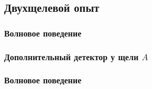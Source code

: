 \subsection{Двухщелевой опыт}
\begin{frame}
    \frametitle{Волновое поведение}
    \begin{figure}
    
    \end{figure}
\end{frame}
\begin{frame}
    \frametitle{Дополнительный детектор у щели $A$}
    \begin{figure}
    
    \end{figure}
\end{frame}
\begin{frame}
    \frametitle{Волновое поведение}
    \begin{figure}
    
    \end{figure}
\end{frame}
